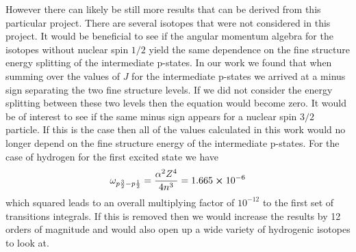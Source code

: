 However there can likely be still more results that can be derived from this particular project. There are several isotopes that were not considered in this project. It would be beneficial to see if the angular momentum algebra for the isotopes without nuclear spin $1/2$ yield the same dependence on the fine structure energy splitting of the intermediate p-states. In our work we found that when summing over the values of $J$ for the intermediate p-states we arrived at a minus sign separating the two fine structure levels. If we did not consider the energy splitting between these two levels then the equation would become zero. It would be of interest to see if the same minus sign appears for a nuclear spin $3/2$ particle. If this is the case then all of the values calculated in this work would no longer depend on the fine structure energy of the intermediate p-states. For the case of hydrogen for the first excited state we have
\begin{equation}
    \omega_{p\frac{3}{2}-p\frac{1}{2}}=\frac{\alpha^2Z^4}{4n^3}=1.665\cross10^{-6}
\end{equation}
which squared leads to an overall multiplying factor of $10^{-12}$ to the first set of transitions integrals. If this is removed then we would increase the results by 12 orders of magnitude and would also open up a wide variety of hydrogenic isotopes to look at. \cite{demidov1962two}
